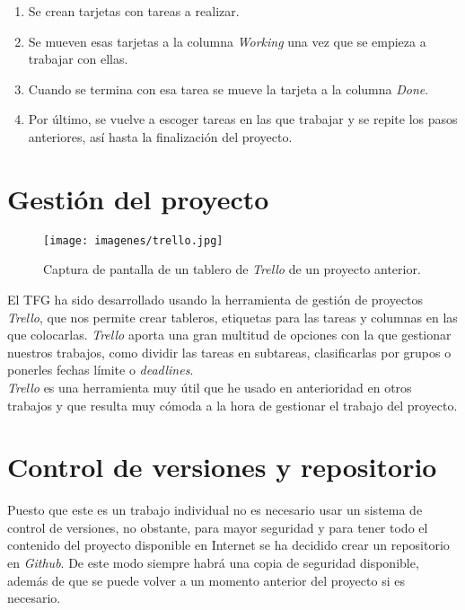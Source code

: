 \begin{enumerate}
	\item Se crean tarjetas con tareas a realizar.
	\item Se mueven esas tarjetas a la columna \textit{Working} una vez que se empieza a trabajar con ellas.
	\item Cuando se termina con esa tarea se mueve la tarjeta a la columna \textit{Done}.
	\item Por último, se vuelve a escoger tareas en las que trabajar y se repite los pasos anteriores, así hasta la finalización del proyecto.
\end{enumerate}
	
\section{Gestión del proyecto}

\begin{figure}
	\begin{center}
		\texttt{[image: imagenes/trello.jpg]}
		\caption{Captura de pantalla de un tablero de \textit{Trello} de un proyecto anterior.}
		\label{trello}
	\end{center}
\end{figure}

El \ac{TFG} ha sido desarrollado usando la herramienta de gestión de proyectos \textit{Trello}, que nos permite crear tableros, etiquetas para las tareas y columnas en las que colocarlas. \textit{Trello} aporta una gran multitud de opciones con la que gestionar nuestros trabajos, como dividir las tareas en subtareas, clasificarlas por grupos o ponerles fechas límite o \textit{deadlines}.
\\

\textit{Trello} es una herramienta muy útil que he usado en anterioridad en otros trabajos y que resulta muy cómoda a la hora de gestionar el trabajo del proyecto.

\section{Control de versiones y repositorio}
	
Puesto que este es un trabajo individual no es necesario usar un sistema de control de versiones, no obstante, para mayor seguridad y para tener todo el contenido del proyecto disponible en Internet se ha decidido crear un repositorio en \textit{Github}.
De este modo siempre habrá una copia de seguridad disponible, además de que se puede volver a un momento anterior del proyecto si es necesario.
\\

